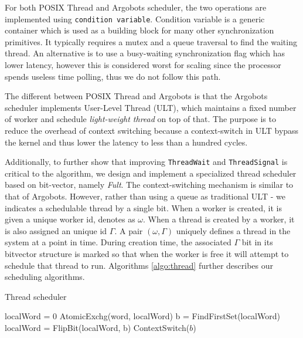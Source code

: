 For both POSIX Thread and Argobots scheduler, the two operations are
implemented using \texttt{condition variable}. Condition variable is a generic
container which is used as a building block for many other synchronization
primitives. It typically requires a mutex and a queue traversal to find the
waiting thread. An alternative is to use a busy-waiting synchronization flag
which has lower latency, however this is considered worst for scaling since the
processor spends useless time polling, thus we do not follow this path.

The different between POSIX Thread and Argobots is that the Argobots scheduler
implements User-Level Thread (ULT), which maintains a fixed number of worker
and schedule \textit{light-weight thread} on top of that. The purpose is to
reduce the overhead of context switching because a context-switch in ULT bypass
the kernel and thus lower the latency to less than a hundred cycles.

Additionally, to further show that improving \texttt{ThreadWait} and
\texttt{ThreadSignal} is critical to the algorithm, we design and implement a
specialized thread scheduler based on bit-vector, namely \textit{Fult}. The
context-switching mechanism is similar to that of Argobots. However, rather
than using a queue as traditional ULT - we indicates a schedulable thread by a
single bit. When a worker is created, it is given a unique worker id, denotes
as $\omega$.  When a thread is created by a worker, it is also assigned an
unique id $\Gamma$.  A pair $(\omega, \Gamma)$ uniquely defines a thread in the
system at a point in time. During creation time, the associated $\Gamma$ bit in
its bitvector structure is marked so that when the worker is free it will
attempt to schedule that thread to run. Algorithms \ref{algo:thread} further
describes our scheduling algorithms. 

\begin{algorithm}
  \caption{Thread scheduler}
  \label{algo:thread}
  \begin{algorithmic}[1]
     
     
        \State localWord = 0
        \State AtomicExchg(word, localWord)
          \State b = FindFirstSet(localWord)
          \State localWord = FlipBit(localWord, b)
          \State ContextSwitch($b$)
        \EndWhile
      \EndIf
      \EndFor
    \EndWhile
    \EndProcedure
  \end{algorithmic}
\end{algorithm}

